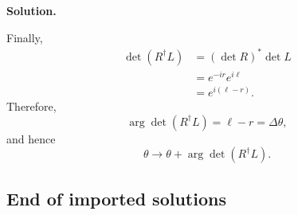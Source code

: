 \documentclass[a4paper,11pt]{article}
\newenvironment{solution}{\par\medskip\noindent\textbf{Solution.}\par\smallskip}{\par\medskip}
\begin{document}
\begin{solution}
Finally,
\begin{equation}
\begin{aligned}
    \det(R^\dagger L)
    &=(\det R)^*\det L\\
    &=e^{-ir}e^{i\ell}\\
    &=e^{i(\ell-r)}.
\end{aligned}
\end{equation}
Therefore,
\begin{equation}
    \arg\det(R^\dagger L)=\ell-r=\Delta\theta,
\end{equation}
and hence
\begin{equation}
    \boxed{
        \theta\to\theta+\arg\det(R^\dagger L)
    }.
\end{equation}
\end{solution}

\subsection{End of imported solutions}
\end{document}

